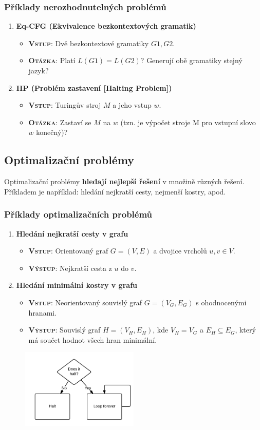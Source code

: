 \subsubsection{Příklady nerozhodnutelných problémů}
\begin{enumerate}
\item \textbf{Eq-CFG (Ekvivalence bezkontextových gramatik)}
\begin{itemize}
\item \textbf{\textsc{Vstup}}: Dvě bezkontextové gramatiky $G1, G2$.
\item \textbf{\textsc{Otázka}}: Platí $L(G1) = L(G2)$? Generují obě gramatiky stejný jazyk?
\end{itemize}
\item \textbf{HP (Problém zastavení [Halting Problem])}
\begin{itemize}
\item \textbf{\textsc{Vstup}}: Turingův stroj $M$ a jeho vstup $w$.
\item \textbf{\textsc{Otázka}}: Zastaví se $M$ na $w$ (tzn. je výpočet stroje M pro vstupní slovo $w$ konečný)?
\end{itemize}
\end{enumerate}

\subsection{Optimalizační problémy}
Optimalizační problémy \textbf{hledají nejlepší řešení} v množině různých řešení. Příkladem je například: hledání nejkratší cesty, nejmenší kostry, apod.

\subsubsection{Příklady optimalizačních problémů}
\begin{enumerate}
\item \textbf{Hledání nejkratší cesty v grafu}
\begin{itemize}
	\item \textbf{\textsc{Vstup}}: Orientovaný graf $G = (V, E)$ a dvojice vrcholů $u, v \in V$.
	\item \textbf{\textsc{Výstup}}: Nejkratší cesta z $u$ do $v$.
\end{itemize}
\item \textbf{Hledání minimální kostry v grafu}
\begin{itemize}
\item \textbf{\textsc{Vstup}}: Neorientovaný souvislý graf $G = (V_G,E_G)$ s ohodnocenými hranami. 
\item \textbf{\textsc{Výstup}}: Souvislý graf $H = (V_H,E_H)$, kde $V_H = V_G$ a $E_H \subseteq E_G$, který má součet hodnot všech hran minimální.
\end{itemize}
\end{enumerate}




\begin{figure}[H]
	\centering
	\includegraphics[width=0.5\textwidth]{assets/halting}
\end{figure}